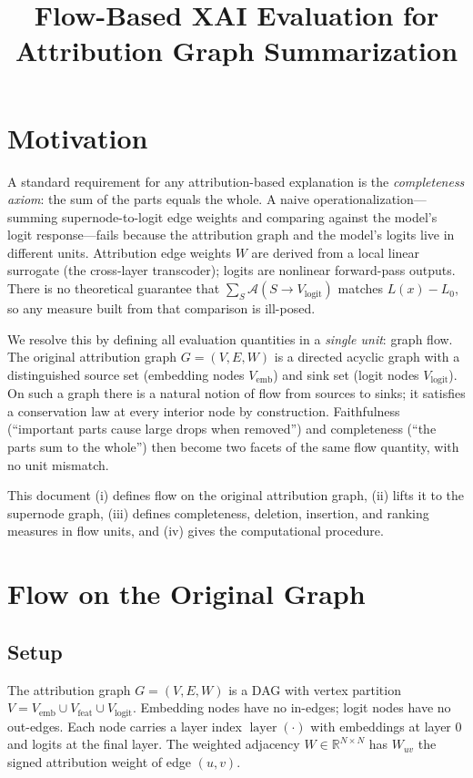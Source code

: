 \documentclass[11pt]{article}
\title{Flow-Based XAI Evaluation for \\ Attribution Graph Summarization}
\author{}
\date{}
\DeclareMathOperator{\layer}{layer}
\begin{document}
\maketitle

\section{Motivation}\label{sec:motivation}

A standard requirement for any attribution-based explanation is the
\emph{completeness axiom}: the sum of the parts equals the whole.
A naive operationalization---summing supernode-to-logit edge
weights and comparing against the model's logit response---fails
because the attribution graph and the model's logits live in
different units. Attribution edge weights $W$ are derived from a
local linear surrogate (the cross-layer transcoder); logits are
nonlinear forward-pass outputs. There is no theoretical guarantee
that $\sum_{S} \mathcal{A}(S \to V_{\text{logit}})$ matches
$L(x) - L_0$, so any measure built from that comparison is
ill-posed.

We resolve this by defining all evaluation quantities in a
\emph{single unit}: graph flow. The original attribution graph
$G = (V, E, W)$ is a directed acyclic graph with a distinguished
source set (embedding nodes $V_{\text{emb}}$) and sink set (logit
nodes $V_{\text{logit}}$). On such a graph there is a natural
notion of flow from sources to sinks; it satisfies a conservation
law at every interior node by construction. Faithfulness
(``important parts cause large drops when removed'') and
completeness (``the parts sum to the whole'') then become two
facets of the same flow quantity, with no unit mismatch.

This document (i) defines flow on the original attribution graph,
(ii) lifts it to the supernode graph, (iii) defines completeness,
deletion, insertion, and ranking measures in flow units, and
(iv) gives the computational procedure.

\section{Flow on the Original Graph}\label{sec:flow}

\subsection{Setup}

The attribution graph $G = (V, E, W)$ is a DAG with vertex partition
$V = V_{\text{emb}} \cup V_{\text{feat}} \cup V_{\text{logit}}$.
Embedding nodes have no in-edges; logit nodes have no out-edges.
Each node carries a layer index $\layer(\cdot)$ with embeddings at
layer 0 and logits at the final layer. The weighted adjacency
$W \in \mathbb{R}^{N \times N}$ has $W_{uv}$ the signed attribution
weight of edge $(u, v)$.
\end{document}
